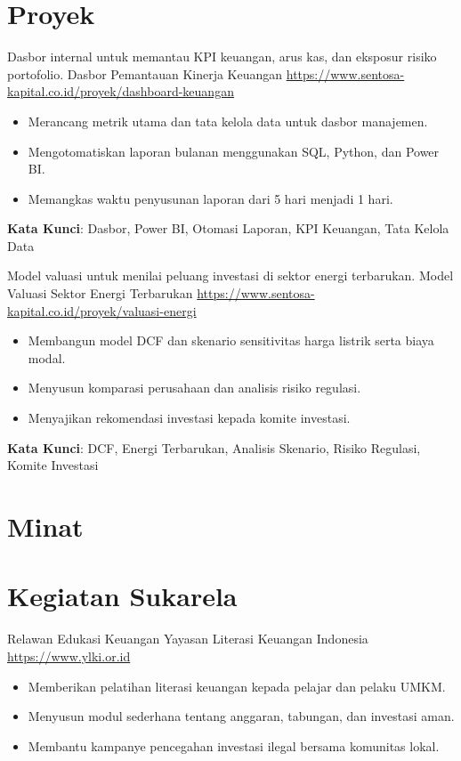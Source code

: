 \documentclass[a4paper, serif, 10pt]{moderncv}
\begin{document}
\section{Proyek}

        {Dasbor internal untuk memantau KPI keuangan, arus kas, dan eksposur risiko portofolio.}
        {Dasbor Pemantauan Kinerja Keuangan}
        {\url{https://www.sentosa-kapital.co.id/proyek/dashboard-keuangan}}
        {}
        {\begin{itemize}
\item Merancang metrik utama dan tata kelola data untuk dasbor manajemen.
\item Mengotomatiskan laporan bulanan menggunakan SQL, Python, dan Power BI.
\item Memangkas waktu penyusunan laporan dari 5 hari menjadi 1 hari.
\end{itemize}
\textbf{Kata Kunci}: Dasbor, Power BI, Otomasi Laporan, KPI Keuangan, Tata Kelola Data}

        {Model valuasi untuk menilai peluang investasi di sektor energi terbarukan.}
        {Model Valuasi Sektor Energi Terbarukan}
        {\url{https://www.sentosa-kapital.co.id/proyek/valuasi-energi}}
        {}
        {\begin{itemize}
\item Membangun model DCF dan skenario sensitivitas harga listrik serta biaya modal.
\item Menyusun komparasi perusahaan dan analisis risiko regulasi.
\item Menyajikan rekomendasi investasi kepada komite investasi.
\end{itemize}
\textbf{Kata Kunci}: DCF, Energi Terbarukan, Analisis Skenario, Risiko Regulasi, Komite Investasi}
\section{Minat}

\section{Kegiatan Sukarela}

        {Relawan Edukasi Keuangan}
        {Yayasan Literasi Keuangan Indonesia}
        {\url{https://www.ylki.or.id}}
        {}
        {\begin{itemize}
\item Memberikan pelatihan literasi keuangan kepada pelajar dan pelaku UMKM.
\item Menyusun modul sederhana tentang anggaran, tabungan, dan investasi aman.
\item Membantu kampanye pencegahan investasi ilegal bersama komunitas lokal.
\end{itemize}}
    
\end{document}
